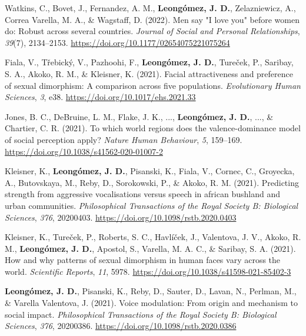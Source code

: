 \documentclass[11pt,a4paper,]{awesome-cv}
\begin{document}
\leavevmode{}%
Watkins, C., Bovet, J., Fernandez, A. M., \textbf{Leongómez, J. D.},
Zelazniewicz, A., Correa Varella, M. A., \& Wagstaff, D. (2022). {Men
say "I love you" before women do: Robust across several countries}.
\emph{Journal of Social and Personal Relationships}, \emph{39}(7),
2134--2153. \url{https://doi.org/10.1177/02654075221075264}

\leavevmode{}%
Fiala, V., Třebický, V., Pazhoohi, F., \textbf{Leongómez, J. D.},
Tureček, P., Saribay, S. A., Akoko, R. M., \& Kleisner, K. (2021).
Facial attractiveness and preference of sexual dimorphism: A comparison
across five populations. \emph{Evolutionary Human Sciences}, \emph{3},
e38. \url{https://doi.org/10.1017/ehs.2021.33}

\leavevmode{}%
Jones, B. C., DeBruine, L. M., Flake, J. K., ...,
\textbf{Leongómez, J. D.}, ..., \& Chartier, C. R. (2021). {To which
world regions does the valence-dominance model of social perception
apply?} \emph{Nature Human Behaviour}, \emph{5}, 159--169.
\url{https://doi.org/10.1038/s41562-020-01007-2}

\leavevmode{}%
Kleisner, K., \textbf{Leongómez, J. D.}, Pisanski, K., Fiala, V.,
Cornec, C., Groyecka, A., Butovskaya, M., Reby, D., Sorokowski, P., \&
Akoko, R. M. (2021). Predicting strength from aggressive vocalisations
versus speech in african bushland and urban communities.
\emph{Philosophical Transactions of the Royal Society B: Biological
Sciences}, \emph{376}, 20200403.
\url{https://doi.org/10.1098/rstb.2020.0403}

\leavevmode{}%
Kleisner, K., Tureček, P., Roberts, S. C., Havlíček, J., Valentova, J.
V., Akoko, R. M., \textbf{Leongómez, J. D.}, Apostol, S., Varella, M. A.
C., \& Saribay, S. A. (2021). How and why patterns of sexual dimorphism
in human faces vary across the world. \emph{Scientific Reports},
\emph{11}, 5978. \url{https://doi.org/10.1038/s41598-021-85402-3}

\leavevmode{}%
\textbf{Leongómez, J. D.}, Pisanski, K., Reby, D., Sauter, D., Lavan,
N., Perlman, M., \& Varella Valentova, J. (2021). Voice modulation:
{From} origin and mechanism to social impact. \emph{Philosophical
Transactions of the Royal Society B: Biological Sciences}, \emph{376},
20200386. \url{https://doi.org/10.1098/rstb.2020.0386}
\end{document}
